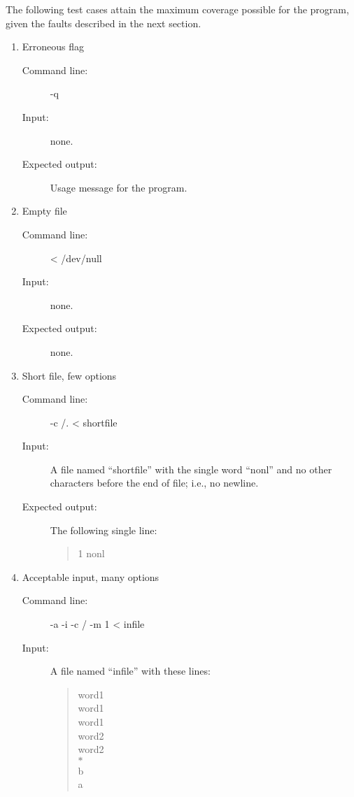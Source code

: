 %
%

The following test cases attain the maximum coverage possible for the
program, given the faults described in the next section.

\begin{enumerate}
\item Erroneous flag

\begin{description}
\item[Command line:] -q
\item[Input:] none.
\item[Expected output:] Usage message for the program.
\end{description}

\item Empty file

\begin{description}
\item[Command line:] < /dev/null
\item[Input:] none.
\item[Expected output:] none.
\end{description}

\item Short file, few options

\begin{description}
\item[Command line:] -c /. < shortfile
\item[Input:] A file named ``shortfile'' with the single word ``nonl''
and no other characters before the end of file; i.e., no newline.
\item[Expected output:]  The following single line:

	\begin{quote}
	1 nonl\\
	\end{quote}
\end{description}

\item Acceptable input, many options

\begin{description}
\item[Command line:] -a -i -c / -m 1 < infile
\item[Input:] A file named ``infile'' with these lines:

	\begin{quote}
	word1\\
	word1\\
	word1\\
	word2\\
	word2\\
	$*$\\
	b\\
	a\\
	\end{quote}


\end{description}
\end{enumerate}
